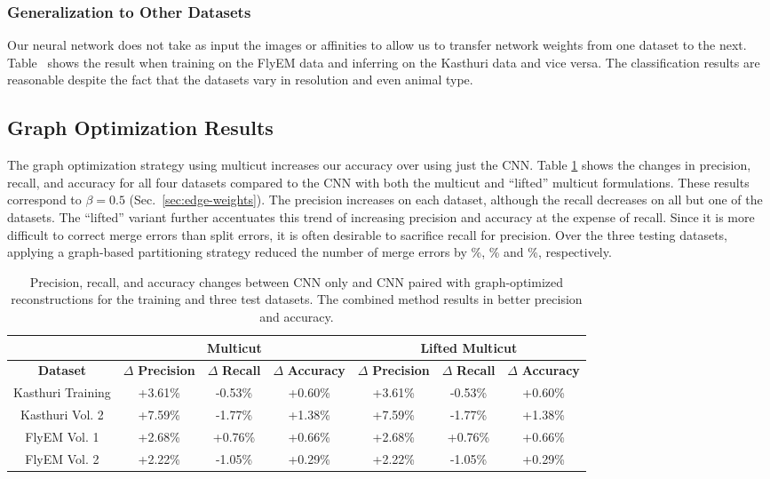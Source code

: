 \subsubsection{Generalization to Other Datasets}

Our neural network does not take as input the images or affinities to allow us to transfer network weights from one dataset to the next.
Table~ shows the result when training on the FlyEM data and inferring on the Kasthuri data and vice versa.
The classification results are reasonable despite the fact that the datasets vary in resolution and even animal type.


\subsection{Graph Optimization Results}

The graph optimization strategy using multicut increases our accuracy over using just the CNN.
Table \ref{table:multicut} shows the changes in precision, recall, and accuracy for all four datasets compared to the CNN with both the multicut and ``lifted'' multicut formulations.
These results correspond to $\beta = 0.5$ (Sec.~\ref{sec:edge-weights}). 
The precision increases on each dataset, although the recall decreases on all but one of the datasets.
The ``lifted'' variant further accentuates this trend of increasing precision and accuracy at the expense of recall. 
Since it is more difficult to correct merge errors than split errors, it is often desirable to sacrifice recall for precision.
Over the three testing datasets, applying a graph-based partitioning strategy reduced the number of merge errors by \%, \% and \%, respectively. 

\begin{table}[h]
	\centering
	\small
	\begin{tabular}{c c c c | c c c} \hline
		& \multicolumn{3}{c}{\textbf{Multicut}} & \multicolumn{3}{c}{\textbf{Lifted Multicut}} \\ \hline
		\textbf{Dataset} & $\Delta$ \textbf{Precision} & $\Delta$ \textbf{Recall} & $\Delta$ \textbf{Accuracy} & $\Delta$ \textbf{Precision} & $\Delta$ \textbf{Recall} & $\Delta$ \textbf{Accuracy} \\ \hline
		Kasthuri Training & +3.61\% & -0.53\% & +0.60\% & +3.61\% & -0.53\% & +0.60\% \\
		Kasthuri Vol. 2 & +7.59\% & -1.77\% & +1.38\%  & +7.59\% & -1.77\% & +1.38\% \\
		FlyEM Vol. 1 & +2.68\% & +0.76\% & +0.66\% & +2.68\% & +0.76\% & +0.66\% \\
		FlyEM Vol. 2 & +2.22\% & -1.05\% & +0.29\% & +2.22\% & -1.05\% & +0.29\% \\ \hline
	\end{tabular}
	\caption{Precision, recall, and accuracy changes between CNN only and CNN paired with graph-optimized reconstructions for the training and three test datasets. The combined method results in better precision and accuracy.}
	\label{table:multicut}
\end{table}

